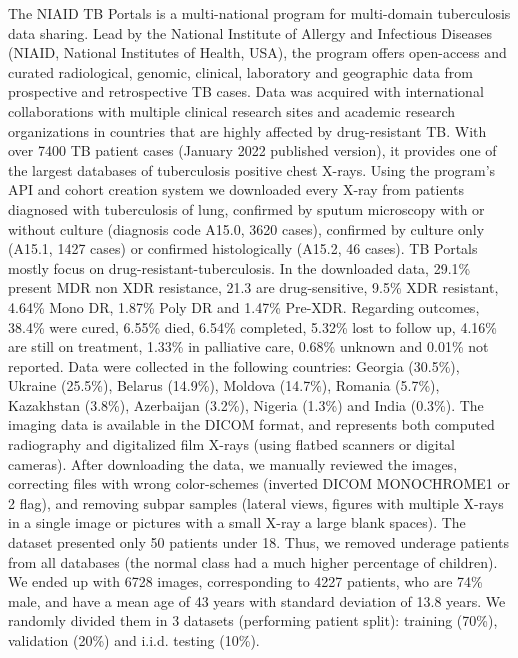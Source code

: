 \documentclass[fleqn,10pt]{wlscirep}
\begin{document}
{The NIAID TB Portals\cite{TBPortals} is a multi-national program for multi-domain tuberculosis data sharing. Lead by the National Institute of Allergy and Infectious Diseases (NIAID, National Institutes of Health, USA), the program offers open-access and curated radiological, genomic, clinical, laboratory and geographic data from prospective and retrospective TB cases\cite{TBPortals}. Data was acquired with international collaborations with multiple clinical research sites and academic research organizations in countries that are highly affected by drug-resistant TB. With over 7400 TB patient cases (January 2022 published version), it provides one of the largest databases of tuberculosis positive chest X-rays. Using the program's API and cohort creation system we downloaded every X-ray from patients diagnosed with tuberculosis of lung, confirmed by sputum microscopy with or without culture (diagnosis code A15.0, 3620 cases), confirmed by culture only (A15.1, 1427 cases) or confirmed histologically (A15.2, 46 cases). TB Portals mostly focus on drug-resistant-tuberculosis. In the downloaded data, 29.1\% present MDR non XDR resistance, 21.3 are drug-sensitive, 9.5\% XDR resistant, 4.64\% Mono DR, 1.87\% Poly DR and 1.47\% Pre-XDR. Regarding outcomes, 38.4\% were cured, 6.55\% died, 6.54\% completed, 5.32\% lost to follow up, 4.16\% are still on treatment, 1.33\% in palliative care, 0.68\% unknown and 0.01\% not reported. Data were collected in the following countries: Georgia (30.5\%), Ukraine (25.5\%), Belarus (14.9\%), Moldova (14.7\%), Romania (5.7\%), Kazakhstan (3.8\%), Azerbaijan (3.2\%), Nigeria (1.3\%) and India (0.3\%). The imaging data is available in the DICOM format, and represents both computed radiography and digitalized film X-rays (using flatbed scanners or digital cameras). After downloading the data, we manually reviewed the images, correcting files with wrong color-schemes (inverted DICOM MONOCHROME1 or 2 flag), and removing subpar samples (lateral views, figures with multiple X-rays in a single image or pictures with a small X-ray a large blank spaces). The dataset presented only 50 patients under 18. Thus, we removed underage patients from all databases (the normal class had a much higher percentage of children). We ended up with 6728 images, corresponding to 4227 patients, who are 74\% male, and have a mean age of 43 years with standard deviation of 13.8 years. We randomly divided them in 3 datasets (performing patient split): training (70\%), validation (20\%) and i.i.d. testing (10\%).

}
\end{document}
